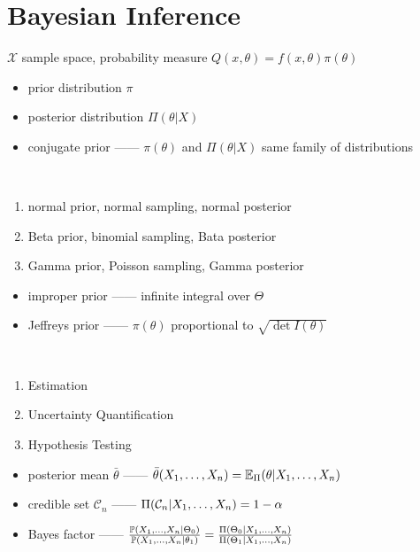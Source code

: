 \section{Bayesian Inference}\label{sec:bayesian-inference}

\begin{setting}
    $\mathcal{X}$ sample space, probability measure $Q(x, \theta) = f(x, \theta)\pi(\theta)$
\end{setting}

\begin{itemize}
    \item prior distribution $\pi$
    \item posterior distribution $\Pi(\theta|X)$
    \item conjugate prior ------ $\pi(\theta)$ and $\Pi(\theta|X)$ same family of distributions
\end{itemize}

\begin{example}\,
\begin{enumerate}
    \item normal prior, normal sampling, normal posterior
    \item Beta prior, binomial sampling, Bata posterior
    \item Gamma prior, Poisson sampling, Gamma posterior
\end{enumerate}
\end{example}

\begin{itemize}
    \item improper prior ------ infinite integral over $\Theta$
    \item Jeffreys prior ------ $\pi(\theta)$ proportional to $\sqrt{\det I(\theta)}$
\end{itemize}

\begin{goal}\,
    \begin{enumerate}
        \item Estimation
        \item Uncertainty Quantification
        \item Hypothesis Testing
    \end{enumerate}
\end{goal}

\begin{itemize}
    \item posterior mean $\bar \theta$ ------ $\bar \theta(\ddd{X}) = \Ex_\Pi(\theta |\ddd{X})$
    \item credible set $\mathcal{C}_n$ ------ $\Pi(\mathcal{C}_n|\ddd{X}) = 1 - \alpha$
    \item Bayes factor ------ $\frac{\Pb(\ddd{X}|\Theta_0)}{\Pb(\ddd{X}|\theta_1)} = \frac{\Pi(\Theta_0|\ddd{X})}{\Pi(\Theta_1|\ddd{X})}$
\end{itemize}

